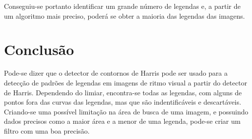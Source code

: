 \documentclass[10pt,a4paper]{article}
\begin{document}
Conseguiu-se portanto identificar um grande número de legendas e, a
partir de um algoritmo mais preciso, poderá se obter a maioria das legendas das imagens.

\section{Conclusão}
Pode-se dizer que o detector de contornos de Harris pode 
ser usado para a detecção de padrões de legendas em imagens de ritmo visual a
partir do detector de Harris.
Dependendo do limiar, encontra-se todas as legendas, com alguns de
pontos fora das curvas das legendas, mas que são indentificáveis e descartáveis.
Criando-se uma possível limitação na área de busca de uma imagem, e
possuindo dados precisos como a maior área e a menor de uma legenda,
pode-se criar um filtro com uma boa precisão.


\begin{small}
  
\end{small}
\end{document}
